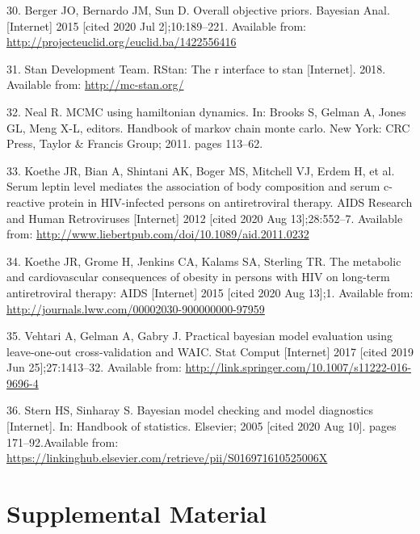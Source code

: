 \documentclass[
]{article}
\begin{document}
\leavevmode\hypertarget{ref-berger_overall_2015}{}%
30. Berger JO, Bernardo JM, Sun D. Overall objective priors. Bayesian Anal. {[}Internet{]} 2015 {[}cited 2020 Jul 2{]};10:189--221. Available from: \url{http://projecteuclid.org/euclid.ba/1422556416}

\leavevmode\hypertarget{ref-stan_development_team_rstan:_2018}{}%
31. Stan Development Team. RStan: The r interface to stan {[}Internet{]}. 2018. Available from: \url{http://mc-stan.org/}

\leavevmode\hypertarget{ref-neal_mcmc_2011}{}%
32. Neal R. MCMC using hamiltonian dynamics. In: Brooks S, Gelman A, Jones GL, Meng X-L, editors. Handbook of markov chain monte carlo. New York: CRC Press, Taylor \& Francis Group; 2011. pages 113--62.

\leavevmode\hypertarget{ref-koethe_serum_2012}{}%
33. Koethe JR, Bian A, Shintani AK, Boger MS, Mitchell VJ, Erdem H, et al. Serum leptin level mediates the association of body composition and serum c-reactive protein in HIV-infected persons on antiretroviral therapy. AIDS Research and Human Retroviruses {[}Internet{]} 2012 {[}cited 2020 Aug 13{]};28:552--7. Available from: \url{http://www.liebertpub.com/doi/10.1089/aid.2011.0232}

\leavevmode\hypertarget{ref-koethe_metabolic_2015}{}%
34. Koethe JR, Grome H, Jenkins CA, Kalams SA, Sterling TR. The metabolic and cardiovascular consequences of obesity in persons with HIV on long-term antiretroviral therapy: AIDS {[}Internet{]} 2015 {[}cited 2020 Aug 13{]};1. Available from: \url{http://journals.lww.com/00002030-900000000-97959}

\leavevmode\hypertarget{ref-vehtari_practical_2017}{}%
35. Vehtari A, Gelman A, Gabry J. Practical bayesian model evaluation using leave-one-out cross-validation and WAIC. Stat Comput {[}Internet{]} 2017 {[}cited 2019 Jun 25{]};27:1413--32. Available from: \url{http://link.springer.com/10.1007/s11222-016-9696-4}

\leavevmode\hypertarget{ref-stern_bayesian_2005}{}%
36. Stern HS, Sinharay S. Bayesian model checking and model diagnostics {[}Internet{]}. In: Handbook of statistics. Elsevier; 2005 {[}cited 2020 Aug 10{]}. pages 171--92.Available from: \url{https://linkinghub.elsevier.com/retrieve/pii/S016971610525006X}

\newpage

\hypertarget{supplemental-material}{%
\section*{Supplemental Material}\label{supplemental-material}}
\end{document}
